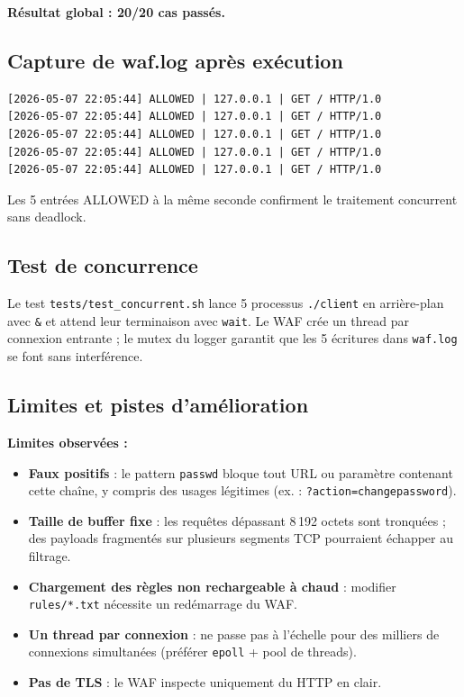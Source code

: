 \documentclass[12pt,a4paper]{article}
\begin{document}
\textbf{Résultat global : 20/20 cas passés.}

\subsection{Capture de waf.log après exécution}

\begin{lstlisting}[style=monospace]
[2026-05-07 22:05:44] ALLOWED | 127.0.0.1 | GET / HTTP/1.0
[2026-05-07 22:05:44] ALLOWED | 127.0.0.1 | GET / HTTP/1.0
[2026-05-07 22:05:44] ALLOWED | 127.0.0.1 | GET / HTTP/1.0
[2026-05-07 22:05:44] ALLOWED | 127.0.0.1 | GET / HTTP/1.0
[2026-05-07 22:05:44] ALLOWED | 127.0.0.1 | GET / HTTP/1.0
\end{lstlisting}

Les 5 entrées ALLOWED à la même seconde confirment le traitement concurrent sans deadlock.

\subsection{Test de concurrence}

Le test \texttt{tests/test\_concurrent.sh} lance 5 processus \texttt{./client} en arrière-plan avec \texttt{\&} et attend leur terminaison avec \texttt{wait}. Le WAF crée un thread par connexion entrante ; le mutex du logger garantit que les 5 écritures dans \texttt{waf.log} se font sans interférence.

\subsection{Limites et pistes d'amélioration}

\textbf{Limites observées :}

\begin{itemize}
  \item \textbf{Faux positifs} : le pattern \texttt{passwd} bloque tout URL ou paramètre contenant cette chaîne, y compris des usages légitimes (ex. : \texttt{?action=changepassword}).
  \item \textbf{Taille de buffer fixe} : les requêtes dépassant 8\,192 octets sont tronquées ; des payloads fragmentés sur plusieurs segments TCP pourraient échapper au filtrage.
  \item \textbf{Chargement des règles non rechargeable à chaud} : modifier \texttt{rules/*.txt} nécessite un redémarrage du WAF.
  \item \textbf{Un thread par connexion} : ne passe pas à l'échelle pour des milliers de connexions simultanées (préférer \texttt{epoll} + pool de threads).
  \item \textbf{Pas de TLS} : le WAF inspecte uniquement du HTTP en clair.
\end{itemize}
\end{document}
